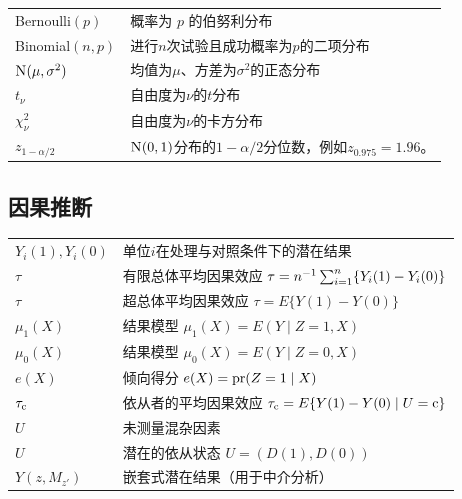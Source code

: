 \begin{tabular}{ll}
\hline 
Bernoulli$(p)$ & 概率为 $p$ 的伯努利分布\\
Binomial$(n,p)$ & 进行$n$次试验且成功概率为$p$的二项分布\\
$\textsc{N}(\mu, \sigma^2)$ & 均值为$\mu$、方差为$\sigma^2$的正态分布\\
$t_\nu$ & 自由度为$\nu$的$t$分布 \\
$\chi^2_\nu$ & 自由度为$\nu$的卡方分布\\
$z_{1-\alpha/2}$ & $\N01$分布的$1-\alpha/2$分位数，例如$z_{0.975}=1.96$。\\
\hline 
\end{tabular}


\subsection*{因果推断}

\begin{tabular}{ll}
\hline 
 $Y_i(1), Y_i(0)$ & 单位$i$在处理与对照条件下的潜在结果\\
$\tau$ & 有限总体平均因果效应 $\tau = n^{-1}\sum_{i=1}^n \{Y_i(1)-Y_i(0)\}$ \\
$\tau$ & 超总体平均因果效应 $\tau = E \{Y(1)-Y(0)\}$\\
$\mu_1(X)$ & 结果模型 $\mu_1(X) = E(Y\mid Z=1, X)$\\
$\mu_0(X)$ & 结果模型 $\mu_0(X) = E(Y\mid Z=0, X)$\\
$e(X)$ & 倾向得分 $e(X) = \textup{pr}(Z=1\mid X)$ \\
$\tau_{\textup{c}}$ & 依从者的平均因果效应 $ \tau_{\textup{c}} = E\{ Y(1) - Y(0)\mid U=\textup{c} \} $ \\
$U$ & 未测量混杂因素 \\
$U$ & 潜在的依从状态 $U=(D(1), D(0))$ \\
$Y(z,M_{z'})$ & 嵌套式潜在结果（用于中介分析）\\
 \hline 
\end{tabular}